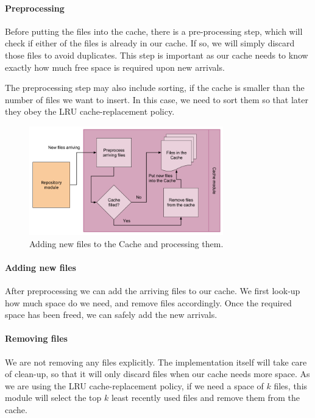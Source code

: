 \documentclass[12pt,twoside,notitlepage]{report}
\begin{document}
\paragraph{Preprocessing}
Before putting the files into the cache, there is a pre-processing step, which will check if either of the files is already in our cache. If so, we will simply discard those files to avoid duplicates. This step is important as our cache needs to know exactly how much free space is required upon new arrivals.

The preprocessing step may also include sorting, if the cache is smaller than the number of files we want to insert. In this case, we need to sort them so that later they obey the LRU cache-replacement policy.
\begin{figure}[h]
\centering
    \includegraphics[width=0.75\textwidth]{cache_module.png}
  \caption{Adding new files to the Cache and processing them.}
  \label{cache_module}
\end{figure}

\paragraph{Adding new files} After preprocessing we can add the arriving files to our cache. We first look-up how much space do we need, and remove files accordingly. Once the required space has been freed, we can safely add the new arrivals.

\paragraph{Removing files} We are not removing any files explicitly. The implementation itself will take care of clean-up, so that it will only discard files when our cache needs more space. As we are using the LRU cache-replacement policy, if we need a space of $k$ files, this module will select the top $k$ least recently used files and remove them from the cache.
\end{document}
